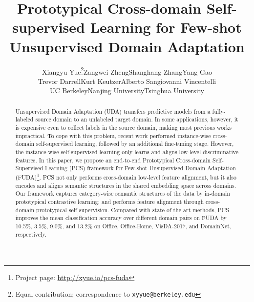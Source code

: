 \documentclass[final]{cvpr}
\begin{document}
\title{Prototypical Cross-domain Self-supervised Learning for Few-shot \\ Unsupervised Domain Adaptation}



\author{Xiangyu Yue\thanks{Equal contribution; correspondence to \texttt{xyyue@berkeley.edu}}\quad Zangwei Zheng\footnotemark[1]\quad Shanghang Zhang\quad Yang Gao \\Trevor Darrell\quad Kurt Keutzer\quad Alberto Sangiovanni Vincentelli
\vspace{1mm}
\\
UC Berkeley\quad Nanjing University\quad Tsinghua University 
}
\maketitle


\begin{abstract}
Unsupervised Domain Adaptation (UDA) transfers predictive models from a fully-labeled source domain to an unlabeled target domain. In some applications, however, it is expensive even to collect labels in the source domain, making most previous works impractical. To cope with this problem, recent work performed instance-wise cross-domain self-supervised learning, 
followed by an additional fine-tuning stage. However, the instance-wise self-supervised learning only learns and aligns low-level discriminative features. In this paper, we propose an end-to-end Prototypical Cross-domain Self-Supervised Learning (PCS) framework for Few-shot Unsupervised Domain Adaptation (FUDA)\footnote{Project page: \url{http://xyue.io/pcs-fuda}}. PCS not only performs cross-domain low-level feature alignment, but it also encodes and aligns semantic structures in the shared embedding space across domains. Our framework captures category-wise semantic structures of the data by in-domain prototypical contrastive learning; and performs feature alignment through cross-domain prototypical self-supervision. Compared with state-of-the-art methods, PCS improves the mean classification accuracy over different domain pairs on FUDA by 10.5\%, 3.5\%, 9.0\%, and 13.2\% on Office, Office-Home, VisDA-2017, and DomainNet, respectively. 
\end{abstract}
\end{document}
